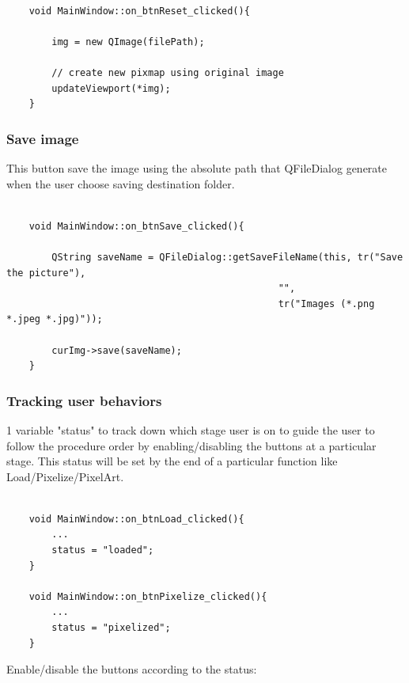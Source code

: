 \documentclass[english]{article}
\begin{document}
{\lstset{language=C++}
\begin{lstlisting}

	void MainWindow::on_btnReset_clicked(){
	
		img = new QImage(filePath);
		
		// create new pixmap using original image
		updateViewport(*img);
	}
\end{lstlisting}



\subsubsection{Save image}

This button save the image using the absolute path that QFileDialog generate when the user choose saving destination folder.

\lstset{language=C++}
\begin{lstlisting}

	void MainWindow::on_btnSave_clicked(){
		
		QString saveName = QFileDialog::getSaveFileName(this, tr("Save the picture"),
												"",
												tr("Images (*.png *.jpeg *.jpg)"));
		
		curImg->save(saveName);
	}
\end{lstlisting}



\subsubsection{Tracking user behaviors}

1 variable "status" to track down which stage user is on to guide the user to follow the procedure order by enabling/disabling the buttons at a particular stage. This status will be set by the end of a particular function like Load/Pixelize/PixelArt.

\lstset{language=C++}

\begin{lstlisting}

	void MainWindow::on_btnLoad_clicked(){
		...
		status = "loaded";
	}
	
	void MainWindow::on_btnPixelize_clicked(){
		...
		status = "pixelized";
	}

\end{lstlisting}

Enable/disable the buttons according to the status:

\begin{lstlisting}


\end{lstlisting}}
\end{document}
